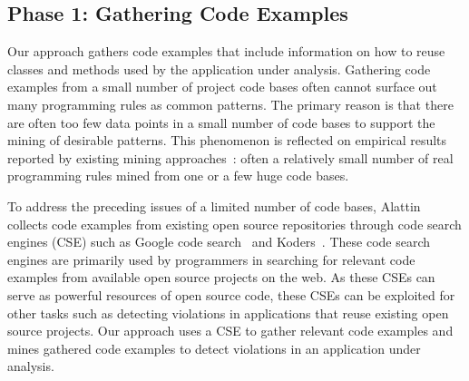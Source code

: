 \subsection {Phase 1: Gathering Code Examples}
\label{sec:cse}

Our approach gathers code examples that include information on how to reuse classes and methods used by the application under analysis. Gathering code examples from a small number of project code bases often cannot surface out many programming rules as common patterns. The primary reason is that there are often too few data points in a small number of code bases to support the mining of desirable patterns. This phenomenon is reflected on empirical results reported by existing mining approaches~\cite{Zhenmin2005PRMiner, chang07:finding}: often a relatively small number of real programming rules mined from one or a few huge code bases. 

To address the preceding issues of a limited number of code bases, Alattin collects code examples from existing open source repositories through code search engines (CSE) such as Google code search~\cite{GCSE} and Koders~\cite{KODERS}. These code search engines are primarily used by programmers in searching for relevant code examples from available open source projects on the web. As these CSEs can serve as powerful resources of open source code, these CSEs can be exploited for other tasks such as detecting violations in applications that reuse existing open source projects. Our approach uses a CSE to gather relevant code examples and mines gathered code examples to detect violations in an application under analysis.

